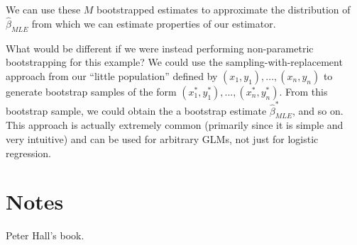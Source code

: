 We can use these $M$ bootstrapped estimates to approximate the distribution of $\hat{\beta}_{MLE}$ from which we can estimate properties of our estimator. 

What would be different if we were instead performing non-parametric bootstrapping for this example? We could use the sampling-with-replacement approach from our ``little population'' defined by $(x_1, y_1), ..., (x_n , y_n)$ to generate bootstrap samples of the form $(x_1^*, y_1^*), ..., (x_n^*, y_n^*)$. From this bootstrap sample, we could obtain the a bootstrap estimate $\hat{\beta}_{MLE}^*$, and so on. This approach is actually extremely common (primarily since it is simple and very intuitive) and can be used for arbitrary GLMs, not just for logistic regression.





\section{Notes}

Peter Hall's book.